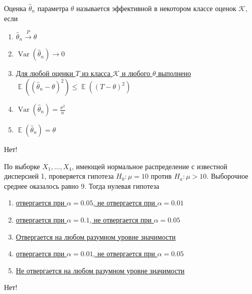\documentclass[t]{beamer}
\DeclareMathOperator{\Var}{Var}
\DeclareMathOperator{\E}{\mathbb{E}}
\begin{document}
 \begin{frame} \label{32-No} 
\begin{block}{32} 

    Оценка  $\hat\theta_n$ параметра $\theta$ называется эффективной в некотором классе оценок $\mathcal{K}$, если


 \end{block} 
\begin{enumerate} 
\item[] \hyperlink{32-No}{\beamergotobutton{} $\hat\theta_n \xrightarrow{P}\theta$}
\item[] \hyperlink{32-No}{\beamergotobutton{} $\Var(\hat\theta_n) \to 0$}
\item[] \hyperlink{32-Yes}{\beamergotobutton{} Для любой оценки $T$ из класса $\mathcal{K}$ и любого $\theta$ выполнено $\E((\hat\theta_n-\theta)^2)\leq \E((T-\theta)^2)$}
\item[] \hyperlink{32-No}{\beamergotobutton{} $\Var(\hat\theta_n)=\frac{\sigma^2}{n}$}
\item[] \hyperlink{32-No}{\beamergotobutton{} $\E(\hat\theta_n)=\theta$}
\end{enumerate} 

 \alert{Нет!} 
\end{frame} 


 \begin{frame} \label{33-No} 
\begin{block}{33} 

  По выборке $X_1,\ldots,X_{4}$, имеющей нормальное распределение с известной дисперсией 1, проверяется гипотеза $H_0: \mu = 10$ против $H_a: \mu > 10$. Выборочное среднее оказалось равно 9. Тогда нулевая гипотеза


 \end{block} 
\begin{enumerate} 
\item[] \hyperlink{33-No}{\beamergotobutton{} отвергается при $\alpha = 0.05$, не отвергается при $\alpha = 0.01$}
\item[] \hyperlink{33-No}{\beamergotobutton{} отвергается при $\alpha = 0.1$, не отвергается при $\alpha = 0.05$}
\item[] \hyperlink{33-No}{\beamergotobutton{} Отвергается на любом разумном уровне значимости}
\item[] \hyperlink{33-No}{\beamergotobutton{} отвергается при $\alpha = 0.01$, не отвергается при $\alpha = 0.05$}
\item[] \hyperlink{33-Yes}{\beamergotobutton{} Не отвергается на любом разумном уровне значимости}
\end{enumerate} 

 \alert{Нет!} 
\end{frame} 
\end{document}
